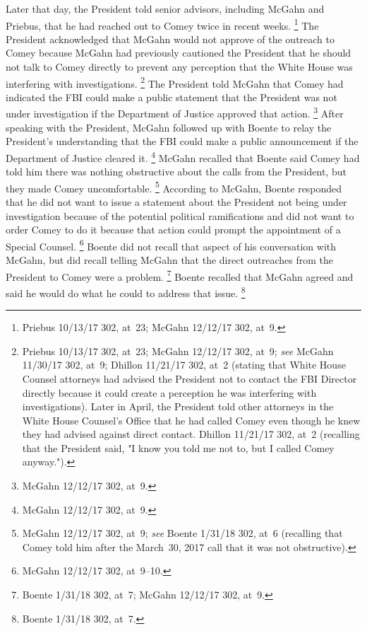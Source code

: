 Later that day, the President told senior advisors, including McGahn and Priebus, that he had reached out to Comey twice in recent weeks.%
\footnote{Priebus 10/13/17 302, at~23;
McGahn 12/12/17 302, at~9.}
The President acknowledged that McGahn would not approve of the outreach to Comey because McGahn had previously cautioned the President that he should not talk to Comey directly to prevent any perception that the White House was interfering with investigations.%
\footnote{Priebus 10/13/17 302, at~23;
McGahn 12/12/17 302, at~9;
\textit{see} McGahn 11/30/17 302, at~9;
Dhillon 11/21/17 302, at~2 (stating that White House Counsel attorneys had advised the President not to contact the FBI Director directly because it could create a perception he was interfering with investigations).
Later in April, the President told other attorneys in the White House Counsel's Office that he had called Comey even though he knew they had advised against direct contact.
Dhillon 11/21/17 302, at~2 (recalling that the President said, "I know you told me not to, but I called Comey anyway.").}
The President told McGahn that Comey had indicated the FBI could make a public statement that the President was not under investigation if the Department of Justice approved that action.%
\footnote{McGahn 12/12/17 302, at~9.}
After speaking with the President, McGahn followed up with Boente to relay the President's understanding that the FBI could make a public announcement if the Department of Justice cleared it.%
\footnote{McGahn 12/12/17 302, at~9.}
McGahn recalled that Boente said Comey had told him there was nothing obstructive about the calls from the President, but they made Comey uncomfortable.%
\footnote{McGahn 12/12/17 302, at~9;
\textit{see} Boente 1/31/18 302, at~6 (recalling that Comey told him after the March~30, 2017 call that it was not obstructive).}
According to McGahn, Boente responded that he did not want to issue a statement about the President not being under investigation because of the potential political ramifications and did not want to order Comey to do it because that action could prompt the appointment of a Special Counsel.%
\footnote{McGahn 12/12/17 302, at~9--10.}
Boente did not recall that aspect of his conversation with McGahn, but did recall telling McGahn that the direct outreaches from the President to Comey were a problem.%
\footnote{Boente 1/31/18 302, at~7;
McGahn 12/12/17 302, at~9.}
Boente recalled that McGahn agreed and said he would do what he could to address that issue.%
\footnote{Boente 1/31/18 302, at~7.}

